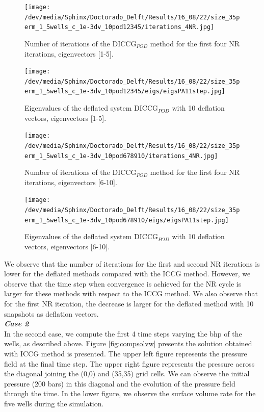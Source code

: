 \documentclass[12pt]{article}
\begin{document}
\begin{figure}[!h]
\centering
\begin{minipage}{.4\textwidth}
 \centering
\texttt{[image: /dev/media/Sphinx/Doctorado\_Delft/Results/16\_08/22/size\_35perm\_1\_5wells\_c\_1e-3dv\_10pod12345/iterations\_4NR.jpg]}
\caption{Number of iterations of the DICCG$_{POD}$ method for the first four NR iterations, eigenvectors [1-5].}
\label{fig:NR_POD1_5}
\end{minipage}%
\hspace{15mm}
\begin{minipage}{.4\textwidth}
 \centering
\texttt{[image: /dev/media/Sphinx/Doctorado\_Delft/Results/16\_08/22/size\_35perm\_1\_5wells\_c\_1e-3dv\_10pod12345/eigs/eigsPA11step.jpg]}
\caption{Eigenvalues of the deflated system DICCG$_{POD}$ with 10 deflation vectors, eigenvectors [1-5].}
\label{fig:eigs_POD1_5}
\end{minipage}
\end{figure}
\begin{figure}[!h]
\centering
\begin{minipage}{.4\textwidth}
 \centering
\texttt{[image: /dev/media/Sphinx/Doctorado\_Delft/Results/16\_08/22/size\_35perm\_1\_5wells\_c\_1e-3dv\_10pod678910/iterations\_4NR.jpg]}
\caption{Number of iterations of the DICCG$_{POD}$ method for the first four NR iterations, eigenvectors [6-10].}
\label{fig:NR_POD6_10}
\end{minipage}%
\hspace{15mm}
\begin{minipage}{.4\textwidth}
 \centering
\texttt{[image: /dev/media/Sphinx/Doctorado\_Delft/Results/16\_08/22/size\_35perm\_1\_5wells\_c\_1e-3dv\_10pod678910/eigs/eigsPA11step.jpg]}
\caption{Eigenvalues of the deflated system DICCG$_{POD}$ with 10 deflation vectors, eigenvectors [6-10].}
\label{fig:eigs_POD6_10}
\end{minipage}
\end{figure}
We observe that the number of iterations for the first and second NR iterations is lower for the deflated methods compared with the ICCG method. However, we observe that the time step when convergence is achieved for the NR cycle is larger for these methods with respect to the ICCG method. We also observe that for the first NR iteration, the decrease is larger for the deflated method with 10 snapshots as deflation vectors.\\
\newpage
\emph{\textbf{Case 2}}\\
In the second case, we compute the first 4 time steps varying the bhp of the wells, as described above. Figure \ref{fig:compsolvw} presents the solution obtained with ICCG method is presented. The upper left figure represents the pressure field at the final time step. The upper right figure represents the pressure across the diagonal joining the (0,0) and (35,35) grid cells. We can observe the initial pressure (200 bars) in this diagonal and the evolution of the pressure field through the time. In the lower figure, we observe the surface volume rate for the five wells during the simulation.
\end{document}
